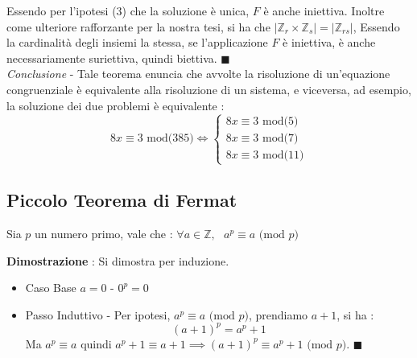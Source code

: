 \documentclass[12pt, letterpaper]{article}
\begin{document}
Essendo per l'ipotesi (3) che la soluzione è unica, \(F\) è anche iniettiva. Inoltre come ulteriore 
rafforzante per la nostra tesi, si ha che \(|\mathbb{Z}_r\times \mathbb{Z}_s|=|\mathbb{Z}_{rs}|\), 
Essendo la cardinalità degli insiemi la stessa, se l'applicazione \(F\) è iniettiva, è anche 
necessariamente suriettiva, quindi biettiva. \(\blacksquare\)
\\\textit{Conclusione} - Tale teorema enuncia che avvolte la risoluzione di un'equazione congruenziale 
è equivalente alla risoluzione di un sistema, e viceversa, ad esempio, la soluzione dei due problemi 
è equivalente :\begin{equation}
    8x\equiv 3 \text{ mod(}385\text{)}\iff \begin{cases}
        8x\equiv 3 \text{ mod(}5\text{)}\\
        8x\equiv 3 \text{ mod(}7\text{)}\\
        8x\equiv 3 \text{ mod(}11\text{)}
    \end{cases}
\end{equation}

\subsection{Piccolo Teorema di Fermat}\label{Fermat}   \begin{center}        
Sia \(p\) un numero primo, vale che : \(\forall a\in \mathbb{Z},\text{ }a^p\equiv a \text{ (mod }p\text{)}\)
\end{center} 
\textbf{Dimostrazione }: Si dimostra per induzione. \begin{itemize}
    \item Caso Base \(a=0\) - \(0^p = 0\)
    \item Passo Induttivo - Per ipotesi, \(a^p\equiv a \text{ (mod }p\text{)}\), prendiamo \(a+1\), si ha 
    : \begin{equation}
        (a+1)^p=a^p+1
    \end{equation}
    Ma \(a^p\equiv a\) quindi \(a^p+1\equiv a+1 \implies (a+1)^p\equiv a^p+1 \text{ (mod }p\text{)}\). \(\blacksquare\)
\end{itemize}  
\end{document}
